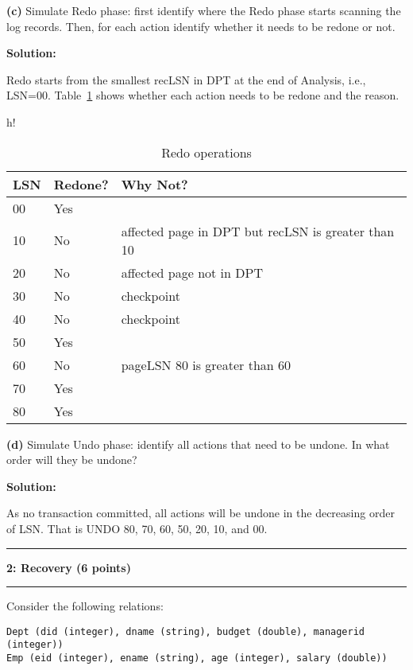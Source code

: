 \documentclass[11pt]{article}
\newcommand\question[2]{\vspace{.25in}\hrule\textbf{#1: #2}\vspace{.5em}\hrule\vspace{.10in}}
\renewcommand\part[1]{\vspace{.10in}\textbf{(#1)}}
\begin{document}
  
  \part{c} Simulate Redo phase: first identify where the Redo phase
  starts scanning the log records. Then, for each action identify whether it needs to be redone or not.
  
  {\bf Solution:}
  
  Redo starts from the smallest recLSN in DPT at the end of Analysis,
  i.e., LSN=00. Table~\ref{redo} shows whether each action needs to 
  be redone and the reason.
  
  \begin{table}{h!}
  \begin{tabular}{ |l |l |l |}\hline
      LSN & Redone? & Why Not? \\\hline
      00 & Yes &   \\\hline
      10 & No & affected page in DPT but recLSN is greater than 10  \\\hline
      20 & No & affected page not in DPT   \\\hline
      30 & No & checkpoint   \\\hline
      40 & No & checkpoint   \\\hline
      50 & Yes &   \\\hline
      60 & No & pageLSN 80 is greater than 60  \\\hline
      70 & Yes &  \\\hline
      80 & Yes &  \\\hline
      \end{tabular}
 \caption{Redo operations}
 \label{redo} 
       
  \end{table}


  
 \part{d} Simulate Undo phase: identify all actions that need to be 
 undone. In what order will they be undone?
 
 {\bf Solution:}
   
   As no transaction committed, all actions will be undone
   in the decreasing order of LSN. That is UNDO 80, 70, 60, 50,
   20, 10, and 00. 


\question{2}{Recovery (6 points)}
Consider the following relations:
\begin{verbatim}
Dept (did (integer), dname (string), budget (double), managerid (integer))
Emp (eid (integer), ename (string), age (integer), salary (double))
\end{verbatim}
\end{document}
